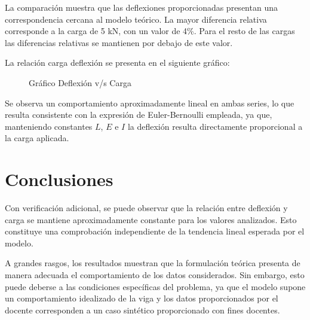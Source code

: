 \documentclass[12pt,a4paper]{article}
\begin{document}
La comparación muestra que las deflexiones proporcionadas presentan una
correspondencia cercana al modelo teórico. La mayor diferencia relativa
corresponde a la carga de 5 kN, con un valor de 4\%. Para el resto de las
cargas las diferencias relativas se mantienen por debajo de este valor.

La relación carga deflexión se presenta en el siguiente gráfico:

\begin{figure}[H]
\centering
{}
\caption{Gráfico Deflexión v/s Carga}
\label{fig:deflexion}
\end{figure}

Se observa un comportamiento aproximadamente lineal en ambas series, lo que
resulta consistente con la expresión de Euler-Bernoulli empleada, ya que,
manteniendo constantes $L$, $E$ e $I$ la deflexión resulta directamente
proporcional a la carga aplicada.

\section{Conclusiones}

Con verificación adicional, se puede observar que la relación entre
deflexión y carga se mantiene aproximadamente constante para los valores
analizados. Esto constituye una comprobación independiente de la tendencia
lineal esperada por el modelo.

A grandes rasgos, los resultados muestran que la formulación teórica
presenta de manera adecuada el comportamiento de los datos considerados.
Sin embargo, esto puede deberse a las condiciones específicas del problema,
ya que el modelo supone un comportamiento idealizado de la viga y los datos
proporcionados por el docente corresponden a un caso sintético proporcionado
con fines docentes.
\end{document}
